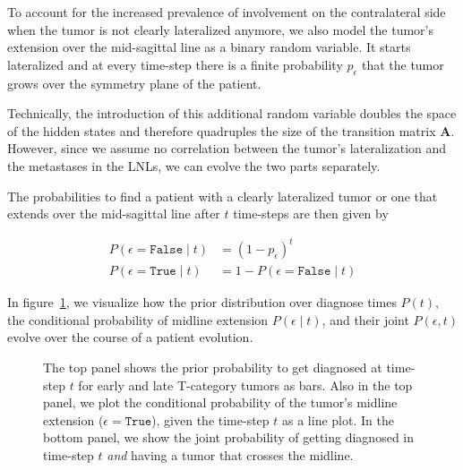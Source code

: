 \documentclass[
  sn-mathphys-num,
]{sn-jnl}
\begin{document}
To account for the increased prevalence of involvement on the
contralateral side when the tumor is not clearly lateralized anymore, we
also model the tumor's extension over the mid-sagittal line as a binary
random variable. It starts lateralized and at every time-step there is a
finite probability \(p_\epsilon\) that the tumor grows over the symmetry
plane of the patient.

Technically, the introduction of this additional random variable doubles
the space of the hidden states and therefore quadruples the size of the
transition matrix \(\mathbf{A}\). However, since we assume no
correlation between the tumor's lateralization and the metastases in the
LNLs, we can evolve the two parts separately.

The probabilities to find a patient with a clearly lateralized tumor or
one that extends over the mid-sagittal line after \(t\) time-steps are
then given by

\[
\begin{aligned}
P(\epsilon = \texttt{False} \mid t) &= (1 - p_\epsilon)^t \\
P(\epsilon = \texttt{True} \mid t) &= 1 - P(\epsilon = \texttt{False} \mid t)
\end{aligned}
\]

In figure~\ref{fig-model-midext-evo}, we visualize how the prior
distribution over diagnose times \(P(t)\), the conditional probability
of midline extension \(P(\epsilon \mid t)\), and their joint
\(P(\epsilon, t)\) evolve over the course of a patient evolution.

\begin{figure}


\caption{\label{fig-model-midext-evo}The top panel shows the prior
probability to get diagnosed at time-step \(t\) for early and late
T-category tumors as bars. Also in the top panel, we plot the
conditional probability of the tumor's midline extension
(\(\epsilon=\texttt{True}\)), given the time-step \(t\) as a line plot.
In the bottom panel, we show the joint probability of getting diagnosed
in time-step \(t\) \emph{and} having a tumor that crosses the midline.}

\end{figure}%
\end{document}
